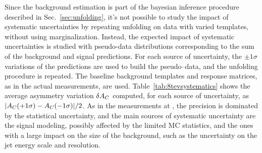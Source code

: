 Since the background estimation is part of the bayesian inference
procedure described in Sec.~\ref{sec:unfolding}, it's not possible to
study the impact of systematic uncertainties by repeating unfolding on data with
varied templates, without using marginalization. Instead, the expected
impact of systematic uncertainties is studied with pseudo-data distributions
corresponding to the sum of the background and signal predictions.
For each source of uncertainty, the $\pm{}1\sigma$ variations of the
predictions are used to build the pseudo--data, and the unfolding
procedure is repeated. The baseline background templates and response
matrices, as in the actual measurements, are used.
Table~\ref{tab:8tevsystematics} shows the average asymmetry variation
$\delta{\ensuremath{A_C}{}}$ computed, for each source of uncertainty, as
$|A_C{}(+1\sigma)-A_C{}(-1\sigma)|/2$.
As in the measurements at \seventev{}, the precision is dominated by
the statistical uncertainty, and the main sources of systematic
uncertainty are the signal modeling, possibly affected by the limited
MC statistics, and the ones with a large impact on the size of the
\wjets{} background, such as the uncertainty on the jet energy scale
and resolution. 

